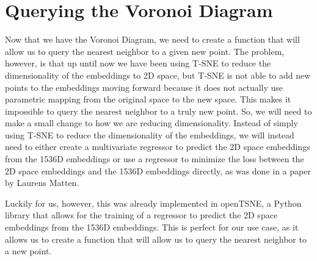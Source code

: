 \documentclass{article}
\begin{document}
\section{Querying the Voronoi Diagram}
Now that we have the Voronoi Diagram, we need to create a function
that will allow us to query the nearest neighbor to a given new point.
The problem, however, is that up until now we have been using T-SNE
to reduce the dimensionality of the embeddings to 2D space, but 
T-SNE is not able to add new points to the embeddings moving forward
because it does not actually use parametric mapping from the
original space to the new space. This makes it impossible to 
query the nearest neighbor to a truly new point. So, we will need to 
make a small change to how we are reducing dimensionality. Instead of
simply using T-SNE to reduce the dimensionality of the embeddings, we
will instead need to either create a multivariate regressor to predict
the 2D space embeddings from the 1536D embeddings or use a regressor to
minimize the loss between the 2D space embeddings and the 1536D embeddings
directly, as was done in a paper by Laurens Matten\cite{LaurensMaaten2009}.
\newline

\noindent
Luckily for us, however, this was already implemented in openTSNE, a Python
library that allows for the training of a regressor to predict the 2D space
embeddings from the 1536D embeddings. This is perfect for our use case, as
it allows us to create a function that will allow us to query the nearest
neighbor to a new point. 

\newpage
{}


\end{document}

